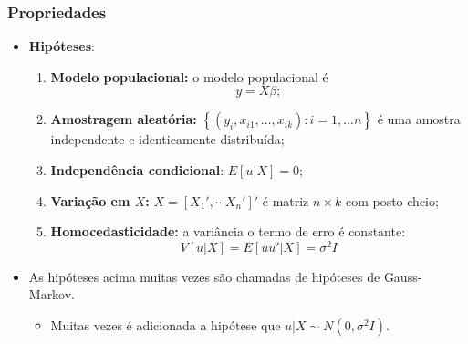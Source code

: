 \documentclass[10pt,slides,xcolor=pdftex,dvipsnames,table]{beamer}
\begin{document}

\begin{frame}[fragile]
	\frametitle{Propriedades}

\begin{itemize}\itemsep1.2em

\item \textbf{Hipóteses}:
\begin{enumerate}
\item \textbf{Modelo populacional:} o modelo populacional é
$$ y = X \beta;$$
\item \textbf{Amostragem aleatória:} $\left\{ (y_i, x_{i1},…, x_{ik}): i=1,...n \right\}$ é uma amostra independente e identicamente distribuída;
\item \textbf{Independência condicional}: $E[u | X ] = 0$;
\item \textbf{Variação em $X$:} $X = [X_1', \cdots X_n']'$ é matriz $n \times k$ com posto cheio;
\item \textbf{Homocedasticidade:} a variância o termo de erro é constante:
$$ V [u | X] = E [u u' | X] = \sigma^2 I $$ 
\end{enumerate}  

\item As hipóteses acima muitas vezes são chamadas de hipóteses de Gauss-Markov.
\begin{itemize}
\item Muitas vezes é adicionada a hipótese que $u | X \sim N(0, \sigma^2 I)$. 
\end{itemize}      

\end{itemize}

\end{frame}

\end{document}
